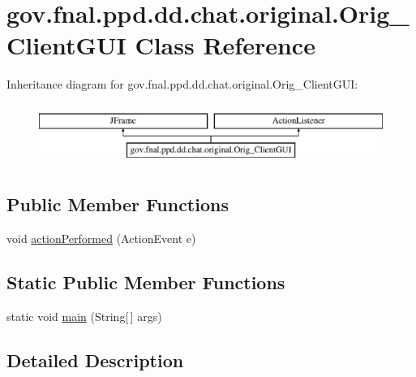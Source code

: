 \hypertarget{classgov_1_1fnal_1_1ppd_1_1dd_1_1chat_1_1original_1_1Orig__ClientGUI}{\section{gov.\-fnal.\-ppd.\-dd.\-chat.\-original.\-Orig\-\_\-\-Client\-G\-U\-I Class Reference}
\label{classgov_1_1fnal_1_1ppd_1_1dd_1_1chat_1_1original_1_1Orig__ClientGUI}
}
Inheritance diagram for gov.\-fnal.\-ppd.\-dd.\-chat.\-original.\-Orig\-\_\-\-Client\-G\-U\-I\-:\begin{figure}[H]
\begin{center}
\leavevmode
\includegraphics[height=2.000000cm]{classgov_1_1fnal_1_1ppd_1_1dd_1_1chat_1_1original_1_1Orig__ClientGUI}
\end{center}
\end{figure}
\subsection*{Public Member Functions}
\begin{DoxyCompactItemize}
\item 
void \hyperlink{classgov_1_1fnal_1_1ppd_1_1dd_1_1chat_1_1original_1_1Orig__ClientGUI_af28354769c07959b7c6fd4332a95d672}{action\-Performed} (Action\-Event e)
\end{DoxyCompactItemize}
\subsection*{Static Public Member Functions}
\begin{DoxyCompactItemize}
\item 
static void \hyperlink{classgov_1_1fnal_1_1ppd_1_1dd_1_1chat_1_1original_1_1Orig__ClientGUI_ad9e39c48ddafa96c84ef8285bbe6ef24}{main} (String\mbox{[}$\,$\mbox{]} args)
\end{DoxyCompactItemize}


\subsection{Detailed Description}


